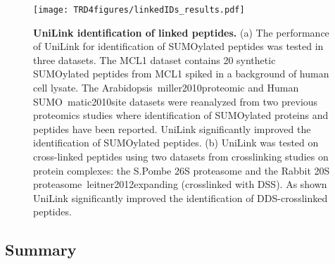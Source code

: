 \begin{figure}[h!]
	\centering
		\texttt{[image: TRD4figures/linkedIDs\_results.pdf]}
		\caption{{\bf UniLink identification of linked
                    peptides.} {\footnotesize (a) The performance
                    of UniLink for identification of SUMOylated
                    peptides was tested in three datasets.  The MCL1
                    dataset contains 20 synthetic SUMOylated peptides
                    from MCL1 spiked in a background of human cell
                    lysate.  The
                    Arabidopsis~\cite{unv}{miller2010proteomic} and
                    Human SUMO~\cite{unv}{matic2010site} datasets were
                    reanalyzed from two previous proteomics studies
                    where identification of SUMOylated proteins and
                    peptides have been reported. UniLink significantly
                    improved the identification of SUMOylated
                    peptides.
                    (b) UniLink was tested on cross-linked
                    peptides using two datasets from crosslinking
                    studies on protein complexes: the S.Pombe 26S
                    proteasome and the Rabbit 20S
                    proteasome~\cite{unv}{leitner2012expanding}
                    (crosslinked with DSS). As shown UniLink
                    significantly improved the identification of
                    DDS-crosslinked peptides.}}
\label{linkedIds}
\end{figure}


\subsection{Summary}


